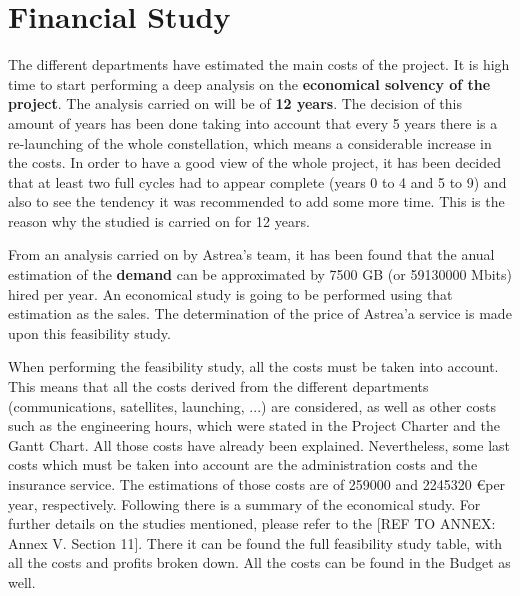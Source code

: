\chapter{Financial Study}

The different departments have estimated the main costs of the project. It is high time to start performing a deep analysis on the \textbf{economical solvency of the project}. The analysis carried on will be of \textbf{12 years}. The decision of this amount of years has been done taking into account that every 5 years there is a re-launching of the whole constellation, which means a considerable increase in the costs. In order to have a good view of the whole project, it has been decided that at least two full cycles had to appear complete (years 0 to 4 and 5 to 9) and also to see the tendency it was recommended to add some more time. This is the reason why the studied is carried on for 12 years.

From an analysis carried on by Astrea's team, it has been found that the anual estimation of the \textbf{demand} can be approximated by 7500 GB (or 59130000 Mbits) hired per year. An economical study is going to be performed using that estimation as the sales. The determination of the price of Astrea'a service is made upon this feasibility study. 

When performing the feasibility study, all the costs must be taken into account. This means that all the costs derived from the different departments (communications, satellites, launching, ...) are considered, as well as other costs such as the engineering hours, which were stated in the Project Charter and the Gantt Chart. All those costs have already been explained. Nevertheless, some last costs which must be taken into account are the administration costs and the insurance service. The estimations of those costs are of 259000 and 2245320 \euro  per year, respectively. Following there is a summary of the economical study. For further details on the studies mentioned, please refer to the [{REF TO ANNEX: Annex V. Section 11}]. There it can be found the full feasibility study table, with all the costs and profits broken down. All the costs can be found in the Budget as well.



